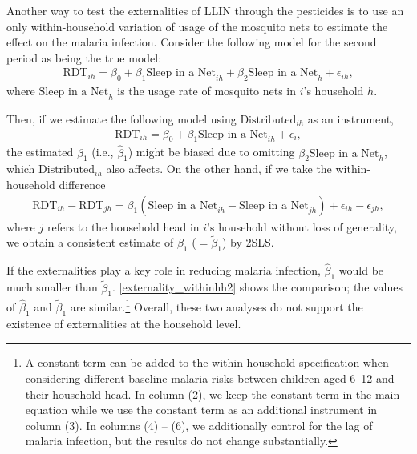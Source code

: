 \documentclass[fleqn,11pt]{article}
\begin{document}
Another way to test the externalities of LLIN through the pesticides is to use an only within-household variation of usage of the mosquito nets to estimate the effect on the malaria infection. Consider the following model for the second period as being the true model:
\begin{gather}
\text{RDT}_{ih}=\beta _0+\beta _1\text{Sleep in a Net} _{ih} + \beta_2 \text{Sleep in a Net}_{h}  + \epsilon _{ih},
\end{gather}
where $\text{Sleep in a Net}_{h}$ is the usage rate of mosquito nets in $i$'s household $h$.

Then, if we estimate the following model using $\text{Distributed}_{ih}$ as an instrument, 
\begin{gather}
\text{RDT}_{ih}=\beta _0+\beta _1\text{Sleep in a Net} _{ih}   + \epsilon _{i},
\end{gather}
the estimated $\beta_1$ (i.e., $\hat{\beta}_1$) might be biased due to omitting $\beta_2 \text{Sleep in a Net}_{h}$, which $\text{Distributed}_{ih}$ also affects.
On the other hand, if we take the within-household difference
\begin{gather}
\text{RDT}_{ih}-\text{RDT}_{jh} =\beta _1(\text{Sleep in a Net} _{ih} - \text{Sleep in a Net} _{jh})     + \epsilon _{ih}-\epsilon _{jh},
\end{gather}
where $j$ refers to the household head in $i$'s household without loss of generality,  we obtain a consistent estimate of $\beta _1$ ($=\tilde{\beta }_1$) by 2SLS. 

If the externalities play a key role in reducing malaria infection, $\hat{\beta}_1$ would be much smaller than $\tilde{\beta}_1$.
\autoref{externality_withinhh2} shows the comparison; the values of $\hat{\beta}_1$ and $\tilde{\beta}_1$ are similar.\footnote{A constant term can be added to the within-household specification when considering different baseline malaria risks between children aged 6--12 and their household head. In column (2), we keep the constant term in the main equation while we use the constant term as an additional instrument in column (3). In columns (4) -- (6), we additionally control for the lag of malaria infection, but the results do not change substantially. } Overall, these two analyses do not support the existence of externalities at the household level.
\end{document}
